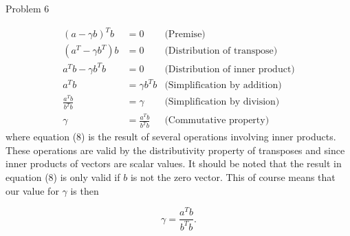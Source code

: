 \begin{problem}{Problem 6}
\begin{highlight}[Solution]
        \begin{align}
            (a - \gamma b)^{T}b & = 0 & \text{(Premise)} \\
            (a^{T} - \gamma b^{T})b & = 0 & \text{(Distribution of transpose)} \\
            a^{T}b - \gamma b^{T}b & = 0  & \text{(Distribution of inner product)} \\
            a^{T}b & = \gamma b^{T}b & \text{(Simplification by addition)} \\
            \frac{a^{T}b}{b^{T}b} & = \gamma & \text{(Simplification by division)} \\
            \gamma & = \frac{a^{T}b}{b^{T}b} & \text{(Commutative property)}
        \end{align}
        where equation (8) is the result of several operations involving inner products. These operations are valid by the distributivity property of transposes and since inner products of vectors are 
        scalar values. It should be noted that the result in equation (8) is only valid if $b$ is not the zero vector. This of course means that our value for $\gamma$ is then

        \begin{equation}
            \gamma = \frac{a^{T}b}{b^{T}b}.
        \end{equation}
    \end{highlight}
\end{problem}


